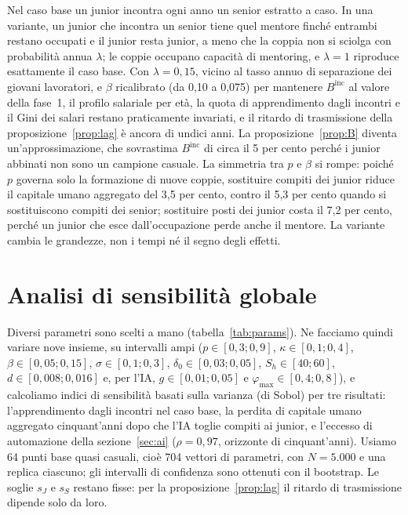\documentclass[preprint,12pt,authoryear]{elsarticle}
\begin{document}
Nel caso base un junior incontra ogni anno un senior estratto a caso. In una variante, un junior che incontra un senior tiene quel mentore finché entrambi restano occupati e il junior resta junior, a meno che la coppia non si sciolga con probabilità annua $\lambda$; le coppie occupano capacità di mentoring, e $\lambda=1$ riproduce esattamente il caso base. Con $\lambda=0{,}15$, vicino al tasso annuo di separazione dei giovani lavoratori, e $\beta$ ricalibrato (da 0,10 a 0,075) per mantenere $B^{\mathrm{inc}}$ al valore della fase~1, il profilo salariale per età, la quota di apprendimento dagli incontri e il Gini dei salari restano praticamente invariati, e il ritardo di trasmissione della proposizione~\ref{prop:lag} è ancora di undici anni. La proposizione~\ref{prop:B} diventa un'approssimazione, che sovrastima $B^{\mathrm{inc}}$ di circa il 5 per cento perché i junior abbinati non sono un campione casuale. La simmetria tra $p$ e $\beta$ si rompe: poiché $p$ governa solo la formazione di nuove coppie, sostituire compiti dei junior riduce il capitale umano aggregato del 3,5 per cento, contro il 5,3 per cento quando si sostituiscono compiti dei senior; sostituire posti dei junior costa il 7,2 per cento, perché un junior che esce dall'occupazione perde anche il mentore. La variante cambia le grandezze, non i tempi né il segno degli effetti.

\section{Analisi di sensibilità globale}\label{app:sobol}

Diversi parametri sono scelti a mano (tabella~\ref{tab:params}). Ne facciamo quindi variare nove insieme, su intervalli ampi ($p\in[0{,}3;0{,}9]$, $\kappa\in[0{,}1;0{,}4]$, $\beta\in[0{,}05;0{,}15]$, $\sigma\in[0{,}1;0{,}3]$, $\delta_0\in[0{,}03;0{,}05]$, $S_h\in[40;60]$, $d\in[0{,}008;0{,}016]$ e, per l'IA, $g\in[0{,}01;0{,}05]$ e $\varphi_{\max}\in[0{,}4;0{,}8]$), e calcoliamo indici di sensibilità basati sulla varianza (di Sobol) \citep{Sobol2001,Saltelli2008} per tre risultati: l'apprendimento dagli incontri nel caso base, la perdita di capitale umano aggregato cinquant'anni dopo che l'IA toglie compiti ai junior, e l'eccesso di automazione della sezione~\ref{sec:ai} ($\rho=0{,}97$, orizzonte di cinquant'anni). Usiamo 64 punti base quasi casuali, cioè 704 vettori di parametri, con $N=5.000$ e una replica ciascuno; gli intervalli di confidenza sono ottenuti con il bootstrap. Le soglie $s_J$ e $s_S$ restano fisse: per la proposizione~\ref{prop:lag} il ritardo di trasmissione dipende solo da loro.
\end{document}
